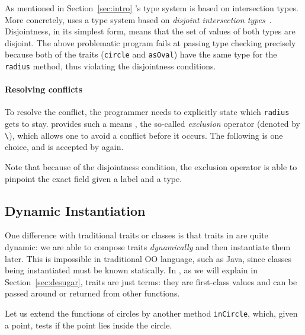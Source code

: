 \noindent As mentioned in Section~\ref{sec:intro} \name's type system is based
on intersection types. More concretely, \name uses a type system based
on \emph{disjoint intersection types}~\cite{oliveira2016disjoint}. Disjointness, in its simplest
form, means that the set of values of both types are disjoint. The above
problematic program fails at passing type checking precisely because both of the
traits (\lstinline{circle} and \lstinline{asOval}) have the same type for the
\lstinline{radius} method, thus violating the disjointness conditions.

\paragraph{Resolving conflicts}
To resolve the conflict, the programmer needs to explicitly state which
\lstinline{radius} gets to stay. \name provides such a means , the so-called
\textit{exclusion} operator (denoted by \lstinline{\}), which allows one to
avoid a conflict before it occurs. The following is one choice, and is accepted
by \name again.

\noindent Note that because of the disjointness condition, the exclusion
operator is able to pinpoint the exact field given a label and a type.

 

\subsection{Dynamic Instantiation}

One difference with traditional traits or classes is that traits in \name are
quite dynamic: we are able to compose traits \textit{dynamically} and then
instantiate them later. This is impossible in traditional OO language, such as
Java, since classes being instantiated must be known statically. In \name, as we
will explain in Section~\ref{sec:desugar}, traits are just terms: they are
first-class values and can be passed around or returned from other functions.

Let us extend the functions of circles by another method \lstinline{inCircle},
which, given a point, tests if the point lies inside the circle.

